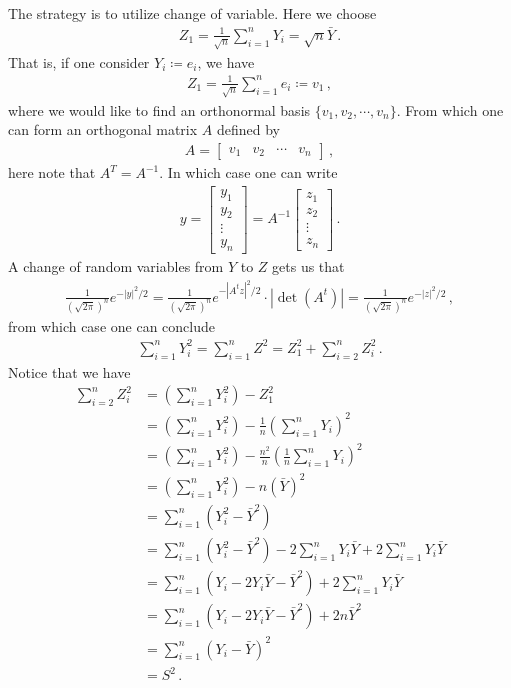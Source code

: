 \documentclass[11pt, onesided]{book}
\theoremstyle{break}
\theoremstyle{break}
\newcommand{\bmat}[1]{\begin{bmatrix} #1 \end{bmatrix}}
\begin{document}
The strategy is to utilize change of variable. Here we choose
\begin{align*}
Z_1 = \frac{1}{\sqrt{n}}\sum_{i=1}^n Y_i = \sqrt{n}\bar{Y}\,.
\end{align*}
That is, if one consider $Y_i \coloneqq e_i$, we have 
\begin{align*}
Z_1 = \frac{1}{\sqrt{n}}\sum_{i=1}^n e_i \coloneqq v_1\,,
\end{align*}
where we would like to find an orthonormal basis $\{v_1,v_2,\cdots, v_n\}$. From which one can form an orthogonal matrix $A$ defined by
\begin{align*}
A = \bmat{v_1 & v_2 &\cdots & v_n}\,,
\end{align*}
here note that $A^T = A^{-1}$. In which case one can write
\begin{align*}
y = \bmat{y_1 \\ y_2 \\ \vdots \\ y_n} = A^{-1}\bmat{z_1 \\ z_2 \\ \vdots \\ z_n}\,.
\end{align*}
A change of random variables from $Y$ to $Z$ gets us that 
\begin{align*}
\frac{1}{(\sqrt{2\pi})^n}e^{-|y|^2 / 2} = \frac{1}{(\sqrt{2\pi})^n} e^{-|A^t z|^2/2} \cdot |\det(A^t)|= \frac{1}{(\sqrt{2\pi})^n} e^{-|z|^2/2}\,,
\end{align*}
from which case one can conclude
\begin{align*}
\sum_{i=1}^n Y_i^2 = \sum_{i=1}^n Z^2 = Z_1^2 + \sum_{i=2}^n Z_i^2\,.
\end{align*}
Notice that we have
\begin{align*}
\sum_{i=2}^n Z_i^2
&=\left(\sum_{i=1}^n Y_i^2\right) - Z_1^2 \\
&= \left(\sum_{i=1}^n Y_i^2\right)- \frac{1}{n}\left( \sum_{i=1}^n Y_i\right)^2 \\
&= \left(\sum_{i=1}^n Y_i^2\right)- \frac{n^2}{n}\left( \frac{1}{n}\sum_{i=1}^n Y_i\right)^2\\
&= \left(\sum_{i=1}^n Y_i^2\right) - n(\bar{Y})^2 \\
&= \sum_{i=1}^n (Y_i^2 - \bar{Y}^2)\\
&= \sum_{i=1}^n (Y_i^2 - \bar{Y}^2) - 2 \sum_{i=1}^n Y_i \bar{Y} + 2\sum_{i=1}^n Y_i\bar{Y}\\
&= \sum_{i=1}^n (Y_i - 2Y_i \bar{Y} - \bar{Y}^2) + 2 \sum_{i=1}^n Y_i \bar{Y}\\
&= \sum_{i=1}^n (Y_i - 2Y_i \bar{Y} - \bar{Y}^2) + 2n\bar{Y}^2 \\
&= \sum_{i=1}^n (Y_i - \bar{Y})^2\\
&= S^2\,.
\end{align*}
\end{document}

